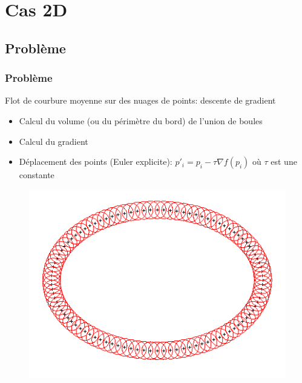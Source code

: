 \documentclass{beamer}
\begin{document}


\section{Cas 2D}

\subsection{Problème}
\begin{frame}
    \frametitle{Problème}

    Flot de courbure moyenne sur des nuages de points: descente de gradient
    \begin{itemize}
        \item Calcul du volume (ou du périmètre du bord) de l'union de boules
        \item Calcul du gradient
        \item Déplacement des points (Euler explicite): $ p'_i = p_i - \tau \nabla f (p_i) $ où $
            \tau $ est une constante
    \end{itemize}

    \begin{figure}
        \centering
        \includegraphics[scale=0.28]{img/ellipse-balls-15}
    \end{figure}
\end{frame}
\end{document}
